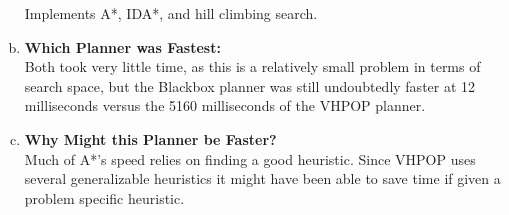 \documentclass[]{article}
\begin{document}
\begin{enumerate}[(a)]
		 Implements A*, IDA*, and hill climbing search.\\
		
	\item \textbf{Which Planner was Fastest:}\\
	Both took very little time, as this is a relatively small problem in terms of search space, but  the Blackbox planner was still undoubtedly faster at 12 milliseconds versus the 5160 milliseconds of the VHPOP planner. 
	
	\item \textbf{Why Might this Planner be Faster?}\\ 
	Much of A*'s speed relies on finding a good heuristic. Since VHPOP uses several generalizable heuristics it might have been able to save time if given a problem specific heuristic.
	
	\end{enumerate}
\end{document}
